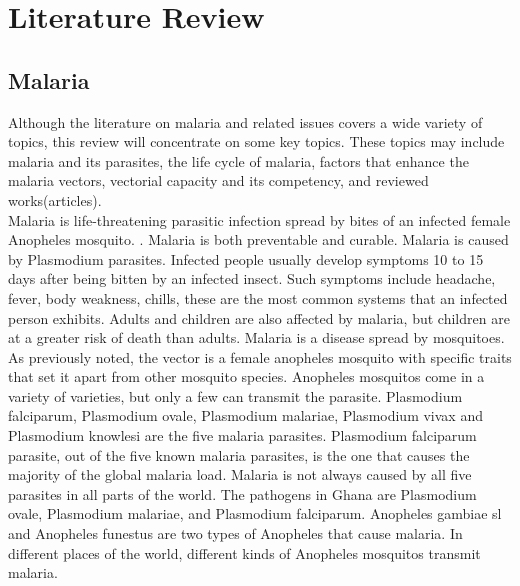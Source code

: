 \label{chapter2}

\chapter{Literature Review}

\section{Malaria}

Although the literature on malaria and related issues covers a wide variety of topics, this review will concentrate on some key topics. These topics may include malaria and its parasites, the life cycle of malaria, factors that enhance the malaria vectors, vectorial capacity and its competency,  and reviewed works(articles).\\

\noindent Malaria is  life-threatening parasitic infection spread by bites of an infected female Anopheles mosquito. \citep{odikamnoro2018incidence}. Malaria is both preventable and curable. Malaria is caused by Plasmodium parasites. Infected people usually develop symptoms 10 to 15 days after being bitten by an infected insect. Such symptoms include headache, fever, body weakness, chills, these are the most common systems that an infected person exhibits. Adults and children are also affected by malaria, but children are at a greater risk of death than adults. Malaria is a disease spread by mosquitoes. As previously noted, the vector is a female anopheles mosquito with specific traits that set it apart from other mosquito species. Anopheles mosquitos come in a variety of varieties, but only a few can transmit the parasite.  Plasmodium falciparum, Plasmodium ovale, Plasmodium malariae, Plasmodium vivax and Plasmodium knowlesi are the five malaria parasites. Plasmodium falciparum parasite, out of the five known malaria parasites, is the one that causes the majority of the global malaria load. Malaria is not always caused by all five parasites in all parts of the world. The pathogens in Ghana are Plasmodium ovale, Plasmodium malariae, and Plasmodium falciparum. Anopheles gambiae sl and Anopheles funestus are two types of Anopheles that cause malaria. In different places of the world, different kinds of Anopheles mosquitos transmit malaria.


